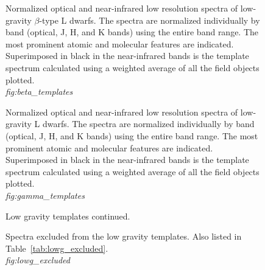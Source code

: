 \documentclass[12pt,preprint]{aastex}
\begin{document}
\begin{figure}
	\caption{Normalized optical and near-infrared low resolution spectra of low-gravity $\beta$-type L
dwarfs. The spectra are normalized individually by band (optical, J, H, and K bands)
using the entire band range. The most prominent atomic and molecular features are indicated. Superimposed in black in the near-infrared
bands is the template spectrum calculated using a weighted average of all the
field objects plotted. \\
\emph{fig:beta\_templates}}
	\label{fig:beta_templates}
\end{figure}

\begin{figure}
	\caption{Normalized optical and near-infrared low resolution spectra of low-gravity L
dwarfs. The spectra are normalized individually by band (optical, J, H, and K bands)
using the entire band range. The most prominent atomic and molecular features are indicated. Superimposed in black in the near-infrared
bands is the template spectrum calculated using a weighted average of all the
field objects plotted. \\
\emph{fig:gamma\_templates}}
	\label{fig:gamma_templates}
\end{figure}

\begin{figure}
	\caption{Low gravity templates continued.}
\end{figure}


\begin{figure}
	\caption{Spectra excluded from the low gravity templates. Also listed in Table~\ref{tab:lowg_excluded}. \\
	\emph{fig:lowg\_excluded}}
	\label{fig:lowg_excluded}
\end{figure}
\end{document}
